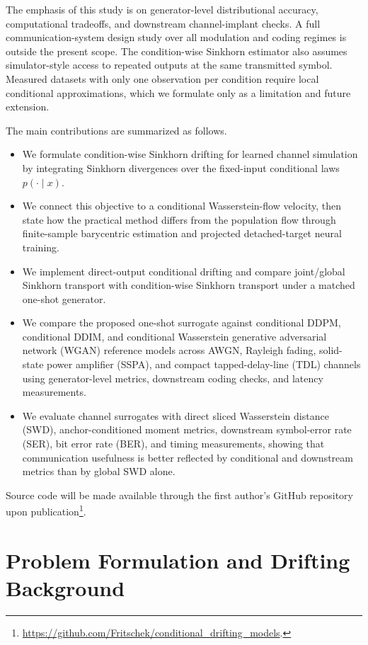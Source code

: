 \documentclass[10pt,journal]{IEEEtran}
\begin{document}
The emphasis of this study is on generator-level distributional accuracy, computational tradeoffs, and downstream channel-implant checks.
A full communication-system design study over all modulation and coding regimes is outside the present scope.
The condition-wise Sinkhorn estimator also assumes simulator-style access to repeated outputs at the same transmitted symbol.
Measured datasets with only one observation per condition require local conditional approximations, which we formulate only as a limitation and future extension.

The main contributions are summarized as follows.
\begin{itemize}
\item We formulate condition-wise Sinkhorn drifting for learned channel simulation by integrating Sinkhorn divergences over the fixed-input conditional laws \(p(\cdot\mid x)\).
\item We connect this objective to a conditional Wasserstein-flow velocity, then state how the practical method differs from the population flow through finite-sample barycentric estimation and projected detached-target neural training.
\item We implement direct-output conditional drifting and compare joint/global Sinkhorn transport with condition-wise Sinkhorn transport under a matched one-shot generator.
\item We compare the proposed one-shot surrogate against conditional DDPM, conditional DDIM, and conditional Wasserstein generative adversarial network (WGAN) reference models across AWGN, Rayleigh fading, solid-state power amplifier (SSPA), and compact tapped-delay-line (TDL) channels using generator-level metrics, downstream coding checks, and latency measurements.
\item We evaluate channel surrogates with direct sliced Wasserstein distance (SWD), anchor-conditioned moment metrics, downstream symbol-error rate (SER), bit error rate (BER), and timing measurements, showing that communication usefulness is better reflected by conditional and downstream metrics than by global SWD alone.
\end{itemize}
Source code will be made available through the first author's GitHub repository upon publication\footnote{\url{https://github.com/Fritschek/conditional_drifting_models}.}.

\section{Problem Formulation and Drifting Background}
\end{document}
